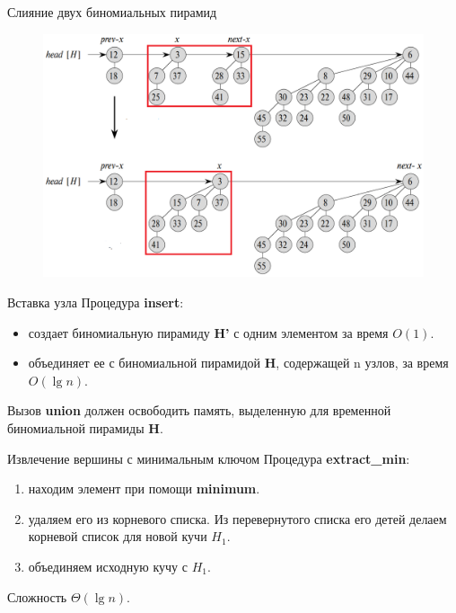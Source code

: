 \begin{frame}{Слияние двух биномиальных пирамид}
	\begin{figure}
		\includegraphics[width=0.8\linewidth]{images/binom-heap-union3.png}
	\end{figure}
\end{frame}

\begin{frame}{Вставка узла}
	Процедура \textbf{insert}:
	\begin{itemize}
		\item создает биномиальную пирамиду \textbf{H'} с одним элементом за время $O(1)$.
		\item объединяет ее с биномиальной пирамидой \textbf{H}, содержащей n узлов, за время $O(\lg n)$. 
	\end{itemize}
	Вызов \textbf{union} должен освободить память, выделенную для временной биномиальной пирамиды \textbf{H}.
\end{frame}

\begin{frame}{Извлечение вершины с минимальным ключом}
	Процедура \textbf{extract\_min}:
	\begin{enumerate}
		\item находим элемент при помощи \textbf{minimum}.
		\item удаляем его из корневого списка. Из перевернутого списка его детей делаем 
		корневой список для новой кучи $H_1$.
		\item объединяем исходную кучу с $H_1$.
	\end{enumerate}
	Сложность $\Theta(\lg n)$.
\end{frame}

